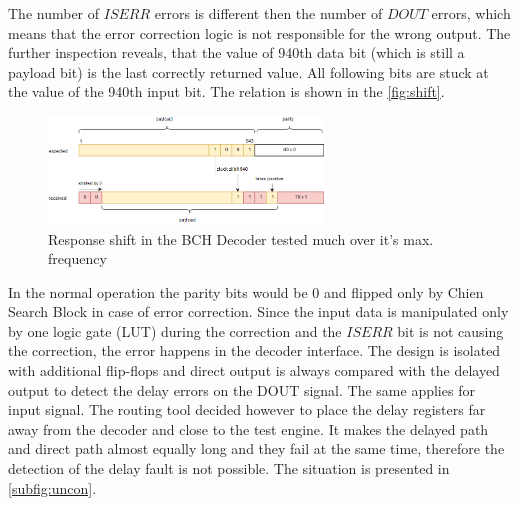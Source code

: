 The number of $ISERR$ errors is different then the number of $DOUT$ errors, which means that the error correction logic is not responsible for the wrong output. The further inspection reveals, that the value of 940th data bit (which is still a payload bit) is the last correctly returned value. All following bits are stuck at the value of the 940th input bit. The relation is shown in the \autoref{fig:shift}.

\begin{figure}[h]
\centering
\includegraphics[width=0.65\textwidth]{figures/decoder_parity.png}
\caption{Response shift in the BCH Decoder tested much over it's max. frequency}
\label{fig:shift}
\end{figure}

In the normal operation the parity bits would be 0 and flipped only by Chien Search Block in case of error correction. Since the input data is manipulated only by one logic gate (LUT) during the correction and the $ISERR$ bit is not causing the correction, the error happens in the decoder interface. The design is isolated with additional flip-flops and direct output is always compared with the delayed output to detect the delay errors on the DOUT signal. The same applies for input signal. The routing tool decided however to place the delay registers far away from the decoder and close to the test engine. It makes the delayed path and direct path almost equally long and they fail at the same time, therefore the detection of the delay fault is not possible. The situation is presented in \autoref{subfig:uncon}.

